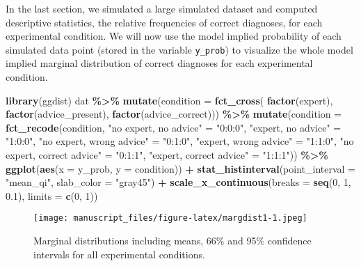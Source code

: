 \documentclass[
  man,floatsintext]{apa6}
\newenvironment{Shaded}{\begin{snugshade}}{\end{snugshade}}
\newcommand{\AttributeTok}[1]{\textcolor[rgb]{0.13,0.29,0.53}{#1}}
\newcommand{\DecValTok}[1]{\textcolor[rgb]{0.00,0.00,0.81}{#1}}
\newcommand{\FloatTok}[1]{\textcolor[rgb]{0.00,0.00,0.81}{#1}}
\newcommand{\FunctionTok}[1]{\textcolor[rgb]{0.13,0.29,0.53}{\textbf{#1}}}
\newcommand{\NormalTok}[1]{#1}
\newcommand{\OtherTok}[1]{\textcolor[rgb]{0.56,0.35,0.01}{#1}}
\newcommand{\SpecialCharTok}[1]{\textcolor[rgb]{0.81,0.36,0.00}{\textbf{#1}}}
\newcommand{\StringTok}[1]{\textcolor[rgb]{0.31,0.60,0.02}{#1}}
\begin{document}
In the last section, we simulated a large simulated dataset and computed descriptive statistics, the relative frequencies of correct diagnoses, for each experimental condition.
We will now use the model implied probability of each simulated data point (stored in the variable \texttt{y\_prob}) to visualize the whole model implied marginal distribution of correct diagnoses for each experimental condition.



\begin{Shaded}
\begin{Highlighting}[]
\FunctionTok{library}\NormalTok{(ggdist)}
\NormalTok{dat }\SpecialCharTok{\%\textgreater{}\%} 
  \FunctionTok{mutate}\NormalTok{(}\AttributeTok{condition =} \FunctionTok{fct\_cross}\NormalTok{(}
    \FunctionTok{factor}\NormalTok{(expert), }\FunctionTok{factor}\NormalTok{(advice\_present), }\FunctionTok{factor}\NormalTok{(advice\_correct))) }\SpecialCharTok{\%\textgreater{}\%}
  \FunctionTok{mutate}\NormalTok{(}\AttributeTok{condition =} \FunctionTok{fct\_recode}\NormalTok{(condition,}
    \StringTok{"no expert, no advice"} \OtherTok{=} \StringTok{"0:0:0"}\NormalTok{, }\StringTok{"expert, no advice"} \OtherTok{=} \StringTok{"1:0:0"}\NormalTok{, }
    \StringTok{"no expert, wrong advice"} \OtherTok{=} \StringTok{"0:1:0"}\NormalTok{, }\StringTok{"expert, wrong advice"} \OtherTok{=} \StringTok{"1:1:0"}\NormalTok{,}
    \StringTok{"no expert, correct advice"} \OtherTok{=} \StringTok{"0:1:1"}\NormalTok{, }\StringTok{"expert, correct advice"} \OtherTok{=} \StringTok{"1:1:1"}\NormalTok{)) }\SpecialCharTok{\%\textgreater{}\%} 
  \FunctionTok{ggplot}\NormalTok{(}\FunctionTok{aes}\NormalTok{(}\AttributeTok{x =}\NormalTok{ y\_prob, }\AttributeTok{y =}\NormalTok{ condition)) }\SpecialCharTok{+}
  \FunctionTok{stat\_histinterval}\NormalTok{(}\AttributeTok{point\_interval =} \StringTok{"mean\_qi"}\NormalTok{, }\AttributeTok{slab\_color =} \StringTok{"gray45"}\NormalTok{) }\SpecialCharTok{+}
  \FunctionTok{scale\_x\_continuous}\NormalTok{(}\AttributeTok{breaks =} \FunctionTok{seq}\NormalTok{(}\DecValTok{0}\NormalTok{, }\DecValTok{1}\NormalTok{, }\FloatTok{0.1}\NormalTok{), }\AttributeTok{limits =} \FunctionTok{c}\NormalTok{(}\DecValTok{0}\NormalTok{, }\DecValTok{1}\NormalTok{))}
\end{Highlighting}
\end{Shaded}

\begin{figure}
\centering
\texttt{[image: manuscript\_files/figure-latex/margdist1-1.jpeg]}
\caption{\label{fig:margdist1}Marginal distributions including means, 66\% and 95\% confidence intervals for all experimental conditions.}
\end{figure}
\end{document}
